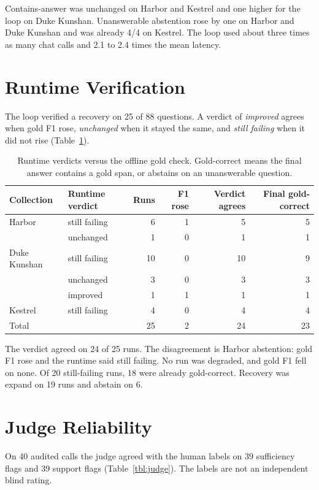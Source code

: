 \documentclass[12pt, a4paper, oneside]{report}
\begin{document}
Contains-answer was unchanged on Harbor and Kestrel and one higher for
the loop on Duke Kunshan. Unanswerable abstention rose by one on Harbor
and Duke Kunshan and was already 4/4 on Kestrel. The loop used about
three times as many chat calls and 2.1 to 2.4 times the mean latency.

\section{Runtime Verification}

The loop verified a recovery on 25 of 88 questions. A verdict of
\emph{improved} agrees when gold F1 rose, \emph{unchanged} when it stayed
the same, and \emph{still failing} when it did not rise
(Table~\ref{tbl:verify}).

\begin{table}[htbp]
\centering
\footnotesize
\begin{tabular}{@{}llrrrr@{}}
\toprule
Collection & Runtime verdict & Runs & F1 rose & Verdict agrees & Final gold-correct \\
\midrule
Harbor & still failing & 6 & 1 & 5 & 5 \\
       & unchanged      & 1 & 0 & 1 & 1 \\
Duke Kunshan & still failing & 10 & 0 & 10 & 9 \\
             & unchanged     & 3  & 0 & 3  & 3 \\
             & improved      & 1  & 1 & 1  & 1 \\
Kestrel & still failing & 4 & 0 & 4 & 4 \\
\midrule
Total & & 25 & 2 & 24 & 23 \\
\bottomrule
\end{tabular}
\caption{Runtime verdicts versus the offline gold check. Gold-correct means
the final answer contains a gold span, or abstains on an unanswerable
question.}
\label{tbl:verify}
\end{table}

The verdict agreed on 24 of 25 runs. The disagreement is Harbor
abstention: gold F1 rose and the runtime said still failing. No run was
degraded, and gold F1 fell on none. Of 20 still-failing runs, 18 were
already gold-correct. Recovery was expand on 19 runs and abstain on 6.

\section{Judge Reliability}

On 40 audited calls the judge agreed with the human labels on 39
sufficiency flags and 39 support flags (Table~\ref{tbl:judge}). The
labels are not an independent blind rating.
\end{document}
